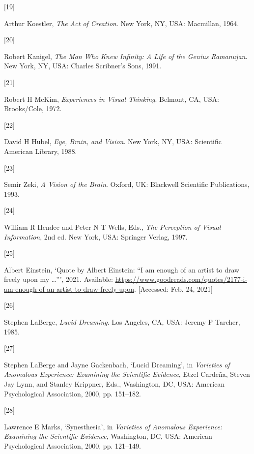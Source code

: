 \documentclass[
  a4paper,
]{article}
\newlength{\cslhangindent}
\newlength{\csllabelwidth}
\newlength{\cslentryspacingunit} %
\newenvironment{CSLReferences}[2] %
 {%
  \setlength{\parindent}{0pt}
  \ifodd #1
  \let\oldpar\par
  \def\par{\hangindent=\cslhangindent\oldpar}
  \fi
  \setlength{\parskip}{#2\cslentryspacingunit}
 }%
 {}
\newcommand{\CSLLeftMargin}[1]{\parbox[t]{\csllabelwidth}{#1}}
\newcommand{\CSLRightInline}[1]{\parbox[t]{\linewidth - \csllabelwidth}{#1}\break}
\begin{document}
\begin{CSLReferences}{0}{0}
\leavevmode{}%
\CSLLeftMargin{{[}19{]} }%
\CSLRightInline{Arthur Koestler, \emph{{The Act of Creation}}. New York,
NY, USA: Macmillan, 1964.}

\leavevmode{}%
\CSLLeftMargin{{[}20{]} }%
\CSLRightInline{Robert Kanigel, \emph{{The Man Who Knew Infinity: A Life
of the Genius Ramanujan}}. New York, NY, USA: Charles Scribner's Sons,
1991.}

\leavevmode{}%
\CSLLeftMargin{{[}21{]} }%
\CSLRightInline{Robert H McKim, \emph{{Experiences in Visual Thinking}}.
Belmont, CA, USA: Brooks/Cole, 1972.}

\leavevmode{}%
\CSLLeftMargin{{[}22{]} }%
\CSLRightInline{David H Hubel, \emph{{Eye, Brain, and Vision}}. New
York, NY, USA: Scientific American Library, 1988.}

\leavevmode{}%
\CSLLeftMargin{{[}23{]} }%
\CSLRightInline{Semir Zeki, \emph{{A Vision of the Brain}}. Oxford, UK:
Blackwell Scientific Publications, 1993.}

\leavevmode{}%
\CSLLeftMargin{{[}24{]} }%
\CSLRightInline{William R Hendee and Peter N T Wells, Eds., \emph{{The
Perception of Visual Information}}, 2nd ed. New York, USA: Springer
Verlag, 1997.}

\leavevmode{}%
\CSLLeftMargin{{[}25{]} }%
\CSLRightInline{Albert Einstein, {`{Quote by Albert Einstein: {``I am
enough of an artist to draw freely upon my \ldots{}''}}'}, 2021.
Available:
\url{https://www.goodreads.com/quotes/2177-i-am-enough-of-an-artist-to-draw-freely-upon}.
{[}Accessed: Feb. 24, 2021{]}}

\leavevmode{}%
\CSLLeftMargin{{[}26{]} }%
\CSLRightInline{Stephen LaBerge, \emph{{Lucid Dreaming}}. Los Angeles,
CA, USA: Jeremy P Tarcher, 1985.}

\leavevmode{}%
\CSLLeftMargin{{[}27{]} }%
\CSLRightInline{Stephen LaBerge and Jayne Gackenbach, {`{Lucid
Dreaming}'}, in \emph{{Varieties of Anomalous Experience: Examining the
Scientific Evidence}}, Etzel Cardeña, Steven Jay Lynn, and Stanley
Krippner, Eds., Washington, DC, USA: American Psychological Association,
2000, pp. 151--182.}

\leavevmode{}%
\CSLLeftMargin{{[}28{]} }%
\CSLRightInline{Lawrence E Marks, {`Synesthesia'}, in \emph{{Varieties
of Anomalous Experience: Examining the Scientific Evidence}},
Washington, DC, USA: American Psychological Association, 2000, pp.
121--149.}


\end{CSLReferences}
\end{document}
